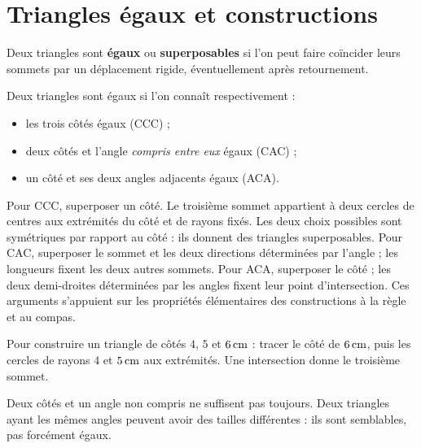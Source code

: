 \documentclass[../cours_3e.tex]{subfiles}
\begin{document}
\section{Triangles égaux et constructions}
\begin{definition}
Deux triangles sont \textbf{égaux} ou \textbf{superposables} si l'on peut faire coïncider leurs sommets par un déplacement rigide, éventuellement après retournement.
\end{definition}
\begin{propriete}
Deux triangles sont égaux si l'on connaît respectivement :
\begin{itemize}
\item les trois côtés égaux (CCC) ;
\item deux côtés et l'angle \emph{compris entre eux} égaux (CAC) ;
\item un côté et ses deux angles adjacents égaux (ACA).
\end{itemize}
\end{propriete}
\begin{demonstration}
Pour CCC, superposer un côté. Le troisième sommet appartient à deux cercles de centres aux extrémités du côté et de rayons fixés. Les deux choix possibles sont symétriques par rapport au côté : ils donnent des triangles superposables.
Pour CAC, superposer le sommet et les deux directions déterminées par l'angle ; les longueurs fixent les deux autres sommets.
Pour ACA, superposer le côté ; les deux demi-droites déterminées par les angles fixent leur point d'intersection. Ces arguments s'appuient sur les propriétés élémentaires des constructions à la règle et au compas.
\end{demonstration}
Pour construire un triangle de côtés $4$, $5$ et $6\,\mathrm{cm}$ : tracer le côté de $6\,\mathrm{cm}$, puis les cercles de rayons $4$ et $5\,\mathrm{cm}$ aux extrémités. Une intersection donne le troisième sommet.
\begin{attention}
Deux côtés et un angle non compris ne suffisent pas toujours. Deux triangles ayant les mêmes angles peuvent avoir des tailles différentes : ils sont semblables, pas forcément égaux.
\end{attention}
\end{document}

